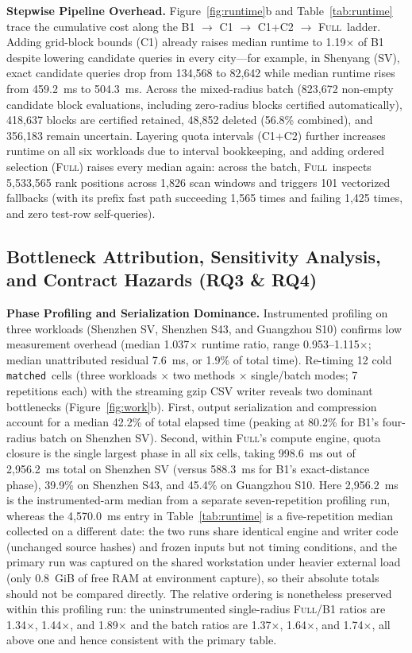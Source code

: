\documentclass[sigconf, nonacm]{acmart}
\newcommand{\full}{\textsc{Full}}
\newcommand{\matched}{\texttt{matched}}
\begin{document}
\textbf{Stepwise Pipeline Overhead.} Figure~\ref{fig:runtime}b and Table~\ref{tab:runtime} trace the cumulative cost along the B1 $\to$ C1 $\to$ C1+C2 $\to$ \full\ ladder. Adding grid-block bounds (C1) already raises median runtime to 1.19$\times$ of B1 despite lowering candidate queries in every city---for example, in Shenyang (SV), exact candidate queries drop from 134{,}568 to 82{,}642 while median runtime rises from 459.2~ms to 504.3~ms. Across the mixed-radius batch (823{,}672 non-empty candidate block evaluations, including zero-radius blocks certified automatically), 418{,}637 blocks are certified retained, 48{,}852 deleted (56.8\% combined), and 356{,}183 remain uncertain. Layering quota intervals (C1+C2) further increases runtime on all six workloads due to interval bookkeeping, and adding ordered selection (\full) raises every median again: across the batch, \full\ inspects 5{,}533{,}565 rank positions across 1{,}826 scan windows and triggers 101 vectorized fallbacks (with its prefix fast path succeeding 1{,}565 times and failing 1{,}425 times, and zero test-row self-queries).

\subsection{Bottleneck Attribution, Sensitivity Analysis, and Contract Hazards (RQ3 \& RQ4)}
\label{sec:bottleneck}
\textbf{Phase Profiling and Serialization Dominance.} Instrumented profiling on three workloads (Shenzhen SV, Shenzhen S43, and Guangzhou S10) confirms low measurement overhead (median 1.037$\times$ runtime ratio, range 0.953--1.115$\times$; median unattributed residual 7.6~ms, or 1.9\% of total time). Re-timing 12 cold \matched\ cells (three workloads $\times$ two methods $\times$ single/batch modes; 7 repetitions each) with the streaming gzip CSV writer reveals two dominant bottlenecks (Figure~\ref{fig:work}b). First, output serialization and compression account for a median 42.2\% of total elapsed time (peaking at 80.2\% for B1's four-radius batch on Shenzhen SV). Second, within \full's compute engine, quota closure is the single largest phase in all six cells, taking 998.6~ms out of 2{,}956.2~ms total on Shenzhen SV (versus 588.3~ms for B1's exact-distance phase), 39.9\% on Shenzhen S43, and 45.4\% on Guangzhou S10. Here 2{,}956.2~ms is the instrumented-arm median from a separate seven-repetition profiling run, whereas the 4{,}570.0~ms entry in Table~\ref{tab:runtime} is a five-repetition median collected on a different date: the two runs share identical engine and writer code (unchanged source hashes) and frozen inputs but not timing conditions, and the primary run was captured on the shared workstation under heavier external load (only 0.8~GiB of free RAM at environment capture), so their absolute totals should not be compared directly. The relative ordering is nonetheless preserved within this profiling run: the uninstrumented single-radius \full/B1 ratios are 1.34$\times$, 1.44$\times$, and 1.89$\times$ and the batch ratios are 1.37$\times$, 1.64$\times$, and 1.74$\times$, all above one and hence consistent with the primary table.
\end{document}
